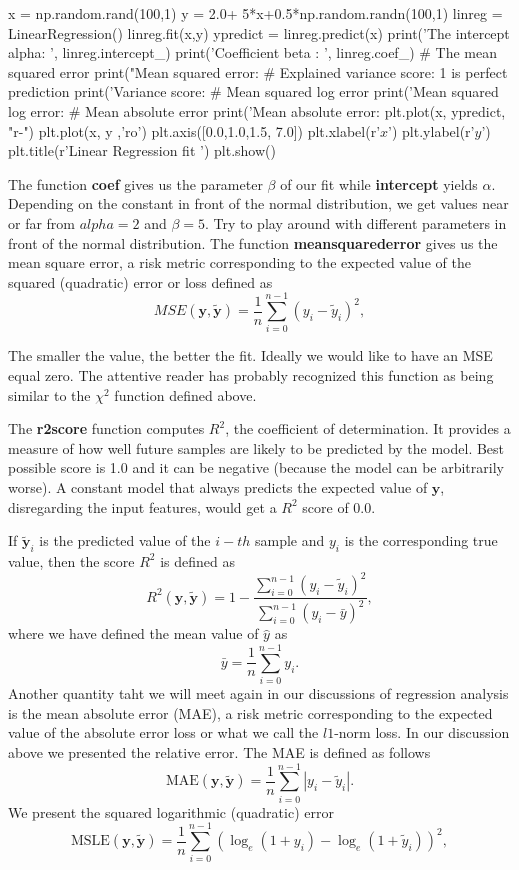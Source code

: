 \documentclass[%
oneside,                 %
final,                   %
10pt]{article}
\begin{document}
x = np.random.rand(100,1)
y = 2.0+ 5*x+0.5*np.random.randn(100,1)
linreg = LinearRegression()
linreg.fit(x,y)
ypredict = linreg.predict(x)
print('The intercept alpha: \n', linreg.intercept_)
print('Coefficient beta : \n', linreg.coef_)
# The mean squared error                               
print("Mean squared error: %
# Explained variance score: 1 is perfect prediction                                 
print('Variance score: %
# Mean squared log error                                                        
print('Mean squared log error: %
# Mean absolute error                                                           
print('Mean absolute error: %
plt.plot(x, ypredict, "r-")
plt.plot(x, y ,'ro')
plt.axis([0.0,1.0,1.5, 7.0])
plt.xlabel(r'$x$')
plt.ylabel(r'$y$')
plt.title(r'Linear Regression fit ')
plt.show()

\epycod
The function \textbf{coef} gives us the parameter $\beta$ of our fit while \textbf{intercept} yields 
$\alpha$. Depending on the constant in front of the normal distribution, we get values near or far from $alpha =2$ and $\beta =5$. Try to play around with different parameters in front of the normal distribution. The function \textbf{meansquarederror} gives us the mean square error, a risk metric corresponding to the expected value of the squared (quadratic) error or loss defined as
\[ MSE(\bm{y},\bm{\tilde{y}}) = \frac{1}{n}
\sum_{i=0}^{n-1}(y_i-\tilde{y}_i)^2, 
\] 


The smaller the value, the better the fit. Ideally we would like to
have an MSE equal zero.  The attentive reader has probably recognized
this function as being similar to the $\chi^2$ function defined above.

The \textbf{r2score} function computes $R^2$, the coefficient of
determination. It provides a measure of how well future samples are
likely to be predicted by the model. Best possible score is 1.0 and it
can be negative (because the model can be arbitrarily worse). A
constant model that always predicts the expected value of $\bm{y}$,
disregarding the input features, would get a $R^2$ score of $0.0$.

If $\tilde{\bm{y}}_i$ is the predicted value of the $i-th$ sample and $y_i$ is the corresponding true value, then the score $R^2$ is defined as
\[
R^2(\bm{y}, \tilde{\bm{y}}) = 1 - \frac{\sum_{i=0}^{n - 1} (y_i - \tilde{y}_i)^2}{\sum_{i=0}^{n - 1} (y_i - \bar{y})^2},
\]
where we have defined the mean value  of $\hat{y}$ as
\[
\bar{y} =  \frac{1}{n} \sum_{i=0}^{n - 1} y_i.
\]
Another quantity taht we will meet again in our discussions of regression analysis is 
 the mean absolute error (MAE), a risk metric corresponding to the expected value of the absolute error loss or what we call the $l1$-norm loss. In our discussion above we presented the relative error.
The MAE is defined as follows
\[
\text{MAE}(\bm{y}, \bm{\tilde{y}}) = \frac{1}{n} \sum_{i=0}^{n-1} \left| y_i - \tilde{y}_i \right|.
\]
We present the 
squared logarithmic (quadratic) error
\[
\text{MSLE}(\bm{y}, \bm{\tilde{y}}) = \frac{1}{n} \sum_{i=0}^{n - 1} (\log_e (1 + y_i) - \log_e (1 + \tilde{y}_i) )^2,
\]
\end{document}
